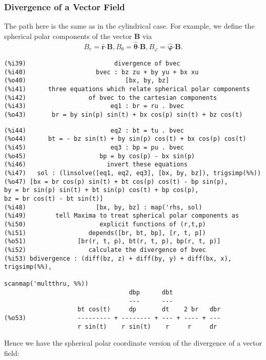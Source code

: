 \documentclass[12pt]{article}
\begin{document}
\subsubsection*{Divergence of a Vector Field}
The path here is the same as in the cylindrical case.
For example, we define the spherical polar components of the vector $\mathbf{B}$ via
\begin{equation}
B_{r} = \mathbf{\hat{r}} \boldsymbol{\cdot} \mathbf{B}, B_{\theta} = 
  \boldsymbol{\hat{\theta}} \boldsymbol{\cdot} \mathbf{B},  B_{\varphi} = 
  \boldsymbol{\hat{\varphi}} \boldsymbol{\cdot} \mathbf{B}.
\end{equation}
\small
\begin{verbatim}
(%i39)                        divergence of bvec 
(%i40)                   bvec : bz zu + by yu + bx xu
(%o40)                           [bx, by, bz]
(%i41)      three equations which relate spherical polar components
(%i42)                 of bvec to the cartesian components 
(%i43)                       eq1 : br = ru . bvec
(%o43)       br = by sin(p) sin(t) + bx cos(p) sin(t) + bz cos(t)
\end{verbatim}
\newpage
\begin{verbatim}
(%i44)                       eq2 : bt = tu . bvec
(%o44)      bt = - bz sin(t) + by sin(p) cos(t) + bx cos(p) cos(t)
(%i45)                       eq3 : bp = pu . bvec
(%o45)                    bp = by cos(p) - bx sin(p)
(%i46)                      invert these equations 
(%i47)   sol : (linsolve([eq1, eq2, eq3], [bx, by, bz]), trigsimp(%%))
(%o47) [bx = br cos(p) sin(t) + bt cos(p) cos(t) - bp sin(p), 
by = br sin(p) sin(t) + bt sin(p) cos(t) + bp cos(p), 
bz = br cos(t) - bt sin(t)]
(%i48)                   [bx, by, bz] : map('rhs, sol)
(%i49)        tell Maxima to treat spherical polar components as 
(%i50)                    explicit functions of (r,t,p) 
(%i51)                 depends([br, bt, bp], [r, t, p])
(%o51)              [br(r, t, p), bt(r, t, p), bp(r, t, p)]
(%i52)                 calculate the divergence of bvec 
(%i53) bdivergence : (diff(bz, z) + diff(by, y) + diff(bx, x), trigsimp(%%), 
                                                        scanmap('multthru, %%))
                                  dbp      dbt
                                  ---      ---
                    bt cos(t)     dp       dt    2 br   dbr
(%o53)              --------- + -------- + --- + ---- + ---
                    r sin(t)    r sin(t)    r     r     dr
\end{verbatim}
\normalsize
Hence we have the spherical polar coordinate version of the divergence of a vector field:
\end{document}
